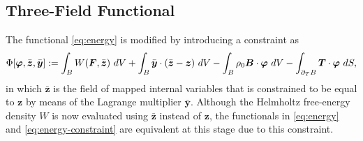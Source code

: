 \documentclass[12pt]{article}
\newcommand{\mbs}[1]{\boldsymbol{#1}}
\def\by{{\mbs{y}}} \def\bz{{\mbs{z}}}
\def\bvarphi{{\mbs{\varphi}}}
\begin{document}
\subsection{Three-Field Functional}

The functional \eqref{eq:energy} is modified by introducing a constraint as
\begin{equation}\label{eq:energy-constraint}
  \Phi[ \bvarphi, \bar{\bz}, \bar{\by} ] :=
  \int_B W(\bF, \bar{\bz}) \ dV
  +
  \int_B \bar{\by} \cdot (\bar{\bz} - \bz) \ dV
  -
  \int_B \rho_0 \bB \cdot \bvarphi \ dV
  -
  \int_{\partial_T B} \bT \cdot \bvarphi \ dS,
\end{equation}
in which $\bar{\bz}$ is the field of mapped internal variables that is
constrained to be equal to $\bz$ by means of the Lagrange multiplier
$\bar{\by}$. Although the Helmholtz free-energy density $W$ is now
evaluated using $\bar{\bz}$ instead of $\bz$, the functionals in
\eqref{eq:energy} and \eqref{eq:energy-constraint} are equivalent at
this stage due to this constraint.
\end{document}
